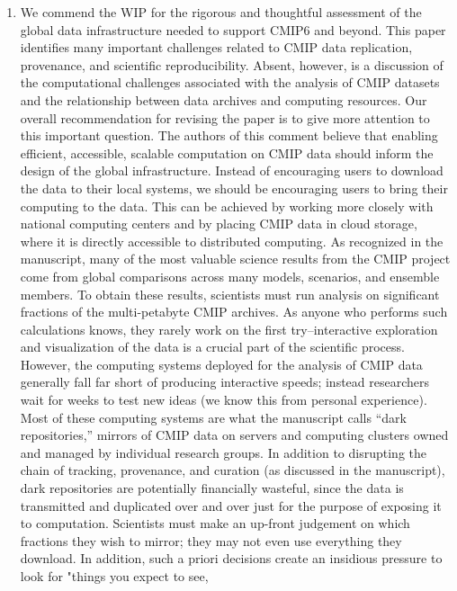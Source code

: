 \documentclass[gmd,manuscript]{copernicus}
\begin{document}
\begin{enumerate}[label=SC1-\arabic*,leftmargin=*]
\item We commend the WIP for the rigorous and thoughtful assessment of
  the global data infrastructure needed to support CMIP6 and beyond.
  This paper identifies many important challenges related to CMIP data
  replication, provenance, and scientific reproducibility. Absent,
  however, is a discussion of the computational challenges associated
  with the analysis of CMIP datasets and the relationship between data
  archives and computing resources. Our overall recommendation for
  revising the paper is to give more attention to this important
  question. The authors of this comment believe that enabling
  efficient, accessible, scalable computation on CMIP data should
  inform the design of the global infrastructure. Instead of
  encouraging users to download the data to their local systems, we
  should be encouraging users to bring their computing to the data.
  This can be achieved by working more closely with national computing
  centers and by placing CMIP data in cloud storage, where it is
  directly accessible to distributed computing. As recognized in the
  manuscript, many of the most valuable science results from the CMIP
  project come from global comparisons across many models, scenarios,
  and ensemble members. To obtain these results, scientists must run
  analysis on significant fractions of the multi-petabyte CMIP
  archives. As anyone who performs such calculations knows, they
  rarely work on the first try--interactive exploration and
  visualization of the data is a crucial part of the scientific
  process. However, the computing systems deployed for the analysis of
  CMIP data generally fall far short of producing interactive speeds;
  instead researchers wait for weeks to test new ideas (we know this
  from personal experience). Most of these computing systems are what
  the manuscript calls “dark repositories,” mirrors of CMIP data on
  servers and computing clusters owned and managed by individual
  research groups. In addition to disrupting the chain of tracking,
  provenance, and curation (as discussed in the manuscript), dark
  repositories are potentially financially wasteful, since the data is
  transmitted and duplicated over and over just for the purpose of
  exposing it to computation. Scientists must make an up-front
  judgement on which fractions they wish to mirror; they may not even
  use everything they download. In addition, such a priori decisions
  create an insidious pressure to look for "things you expect to see,

\end{enumerate}
\end{document}

